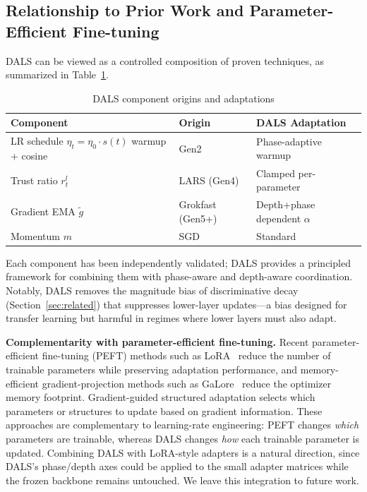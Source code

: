 \documentclass[a4paper,fleqn]{cas-dc}
\begin{document}
\subsection{Relationship to Prior Work and Parameter-Efficient Fine-tuning}\label{sec:related_peft}

DALS can be viewed as a controlled composition of proven techniques, as summarized in Table~\ref{tab:dals_components}.

\begin{table}[h]
\centering
\footnotesize
\renewcommand{\arraystretch}{1.5}
\renewcommand{\tabularxcolumn}[1]{>{\centering\arraybackslash}m{#1}}
\caption{DALS component origins and adaptations}\label{tab:dals_components}
\begin{tabularx}{\columnwidth}{@{} >{\centering\arraybackslash}X m{1.5cm} m{2.2cm} @{}}
\toprule
Component & Origin & DALS Adaptation \\
\midrule
LR schedule \newline $\eta_t = \eta_0 \cdot s(t)$ \newline warmup + cosine & Gen2 & Phase-adaptive \newline warmup \\
\addlinespace[2pt]
Trust ratio $r_t^l$ & LARS (Gen4) & Clamped \newline per-parameter \\
\addlinespace[2pt]
Gradient EMA $\tilde{g}$ & Grokfast (Gen5+) & Depth+phase \newline dependent $\alpha$ \\
\addlinespace[2pt]
Momentum $m$ & SGD & Standard \\
\bottomrule
\end{tabularx}
\end{table}

Each component has been independently validated; DALS provides a principled framework for combining them with phase-aware and depth-aware coordination. Notably, DALS removes the magnitude bias of discriminative decay (Section~\ref{sec:related}) that suppresses lower-layer updates---a bias designed for transfer learning but harmful in regimes where lower layers must also adapt.

\textbf{Complementarity with parameter-efficient fine-tuning.} Recent parameter-efficient fine-tuning (PEFT) methods such as LoRA~\citet{hu2022lora} reduce the number of trainable parameters while preserving adaptation performance, and memory-efficient gradient-projection methods such as GaLore~\citet{zhao2024galore} reduce the optimizer memory footprint. Gradient-guided structured adaptation selects which parameters or structures to update based on gradient information. These approaches are complementary to learning-rate engineering: PEFT changes \emph{which} parameters are trainable, whereas DALS changes \emph{how} each trainable parameter is updated. Combining DALS with LoRA-style adapters is a natural direction, since DALS's phase/depth axes could be applied to the small adapter matrices while the frozen backbone remains untouched. We leave this integration to future work.
\end{document}
